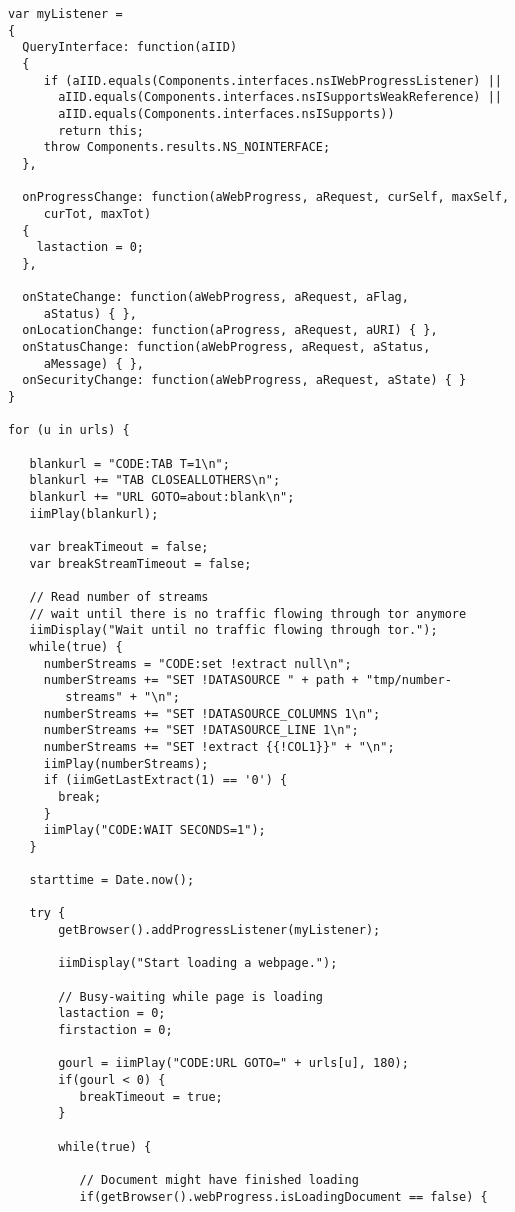 \begin{verbatim}
var myListener =  
{  
  QueryInterface: function(aIID)  
  {  
     if (aIID.equals(Components.interfaces.nsIWebProgressListener) ||  
       aIID.equals(Components.interfaces.nsISupportsWeakReference) ||  
       aIID.equals(Components.interfaces.nsISupports))  
       return this;  
     throw Components.results.NS_NOINTERFACE;  
  },  

  onProgressChange: function(aWebProgress, aRequest, curSelf, maxSelf, 
     curTot, maxTot)
  {
    lastaction = 0;
  },  

  onStateChange: function(aWebProgress, aRequest, aFlag, 
     aStatus) { },   
  onLocationChange: function(aProgress, aRequest, aURI) { },  
  onStatusChange: function(aWebProgress, aRequest, aStatus, 
     aMessage) { },  
  onSecurityChange: function(aWebProgress, aRequest, aState) { }  
}	

for (u in urls) {
	
   blankurl = "CODE:TAB T=1\n";
   blankurl += "TAB CLOSEALLOTHERS\n";
   blankurl += "URL GOTO=about:blank\n";
   iimPlay(blankurl);
		
   var breakTimeout = false;
   var breakStreamTimeout = false;
		
   // Read number of streams
   // wait until there is no traffic flowing through tor anymore
   iimDisplay("Wait until no traffic flowing through tor.");
   while(true) {
     numberStreams = "CODE:set !extract null\n";
     numberStreams += "SET !DATASOURCE " + path + "tmp/number-
        streams" + "\n"; 
     numberStreams += "SET !DATASOURCE_COLUMNS 1\n"; 
     numberStreams += "SET !DATASOURCE_LINE 1\n"; 
     numberStreams += "SET !extract {{!COL1}}" + "\n";
     iimPlay(numberStreams);
     if (iimGetLastExtract(1) == '0') {
       break;
     }
     iimPlay("CODE:WAIT SECONDS=1");
   }
	
   starttime = Date.now();
	
   try {
       getBrowser().addProgressListener(myListener);
        
       iimDisplay("Start loading a webpage.");
		
       // Busy-waiting while page is loading
       lastaction = 0;
       firstaction = 0;
			
       gourl = iimPlay("CODE:URL GOTO=" + urls[u], 180);
       if(gourl < 0) {
          breakTimeout = true;
       }
		
       while(true) {
			
          // Document might have finished loading
          if(getBrowser().webProgress.isLoadingDocument == false) { 
				

\end{verbatim}

